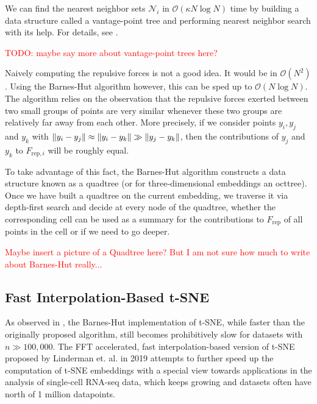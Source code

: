 We can find the nearest neighbor sets $\mathcal{N}_i$ in $\mathcal{O}(\kappa N \log N)$ time by building a data structure called a vantage-point tree and performing nearest neighbor search with its help. For details, see \cite{vdMaa14}. 

\textcolor{red}{TODO: maybe say more about vantage-point trees here?}

Naively computing the repulsive forces is not a good idea. It would be in $\mathcal{O}(N^2)$. 
Using the Barnes-Hut algorithm however, this can be sped up to $\mathcal{O}(N \log N)$. 
The algorithm relies on the observation that the repulsive forces exerted between two small groups of points are very similar whenever these two groups are relatively far away from each other. 
More precisely, if we consider points $y_i, y_j$ and $y_k$ with $\lVert y_i - y_j\rVert \approx \lVert y_i - y_k\rVert \gg \lVert y_j - y_k\rVert$, then the contributions of $y_j$ and $y_k$ to $F_{\text{rep}, i}$ will be roughly equal. 

To take advantage of this fact, the Barnes-Hut algorithm constructs a data structure known as a quadtree (or for three-dimensional embeddings an octtree). 
Once we have built a quadtree on the current embedding, we traverse it via depth-first search and decide at every node of the quadtree, whether the corresponding cell can be used as a summary for the contributions to $F_{\text{rep}}$ of all points in the cell or if we need to go deeper. 

\textcolor{red}{Maybe insert a picture of a Quadtree here? But I am not sure how much to write about Barnes-Hut really...}

\subsection*{Fast Interpolation-Based t-SNE}
As observed in \cite{KoBe19SingleCell}, the Barnes-Hut implementation of t-SNE, while faster than the originally proposed algorithm, still becomes prohibitively slow for datasets with $n \gg 100,000$. 
The FFT accelerated, fast interpolation-based version of t-SNE proposed by Linderman et. al. in 2019 \cite{Lin19} attempts to further speed up the computation of t-SNE embeddings with a special view towards applications in the analysis of single-cell RNA-seq data, which keeps growing and datasets often have north of 1 million datapoints. 

